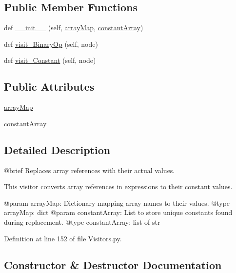 \subsection*{Public Member Functions}
\begin{DoxyCompactItemize}
\item 
def \hyperlink{classVisitors_1_1ArrayValueReplacer_a5f91e1838a4820870ae39478f6195cdc}{\+\_\+\+\_\+init\+\_\+\+\_\+} (self, \hyperlink{classVisitors_1_1ArrayValueReplacer_a3c14dac355802b0266a75f0ee417c14b}{array\+Map}, \hyperlink{classVisitors_1_1ArrayValueReplacer_af8146ce56c53debb8b28c2c19e357077}{constant\+Array})
\item 
def \hyperlink{classVisitors_1_1ArrayValueReplacer_a6329fbf13e2d22de5384fbca843113b8}{visit\+\_\+\+Binary\+Op} (self, node)
\item 
def \hyperlink{classVisitors_1_1ArrayValueReplacer_af527c76a7bf39f449d92deb30bf74144}{visit\+\_\+\+Constant} (self, node)
\end{DoxyCompactItemize}
\subsection*{Public Attributes}
\begin{DoxyCompactItemize}
\item 
\hyperlink{classVisitors_1_1ArrayValueReplacer_a3c14dac355802b0266a75f0ee417c14b}{array\+Map}
\item 
\hyperlink{classVisitors_1_1ArrayValueReplacer_af8146ce56c53debb8b28c2c19e357077}{constant\+Array}
\end{DoxyCompactItemize}


\subsection{Detailed Description}
\begin{DoxyVerb}@brief Replaces array references with their actual values.

This visitor converts array references in expressions to their constant values.

@param arrayMap: Dictionary mapping array names to their values.
@type arrayMap: dict
@param constantArray: List to store unique constants found during replacement.
@type constantArray: list of str
\end{DoxyVerb}
 

Definition at line 152 of file Visitors.\+py.



\subsection{Constructor \& Destructor Documentation}
\mbox{\label{classVisitors_1_1ArrayValueReplacer_a5f91e1838a4820870ae39478f6195cdc}} 
